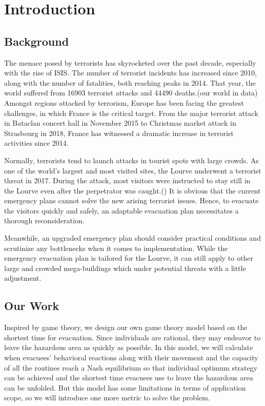 \documentclass{mcmthesis}
\begin{document}
\maketitle                  %

\tableofcontents
\newpage

\section{Introduction}
	\subsection{Background}
	
	The menace posed by terrorists has skyrocketed over the past decade, especially with the rise of ISIS.  The number of terrorist incidents has increased since 2010, along with the number of fatalities, both reaching peaks in 2014. That year, the world suffered from 16903 terrorist attacks and 44490 deaths.(our world in data) Amongst regions attacked by terrorism, Europe has been facing the greatest challenges, in which France is the critical target. From the major terrorist attack in Bataclan concert hall in November 2015 to Christmas market attack in Strasbourg in 2018, France has witnessed a dramatic increase in terrorist activities since 2014.
	
	Normally, terrorists tend to launch attacks in tourist spots with large crowds. As one of the world's largest and most visited sites, the Lourve underwent a terrorist threat in 2017. During the attack, most visitors were instructed to stay still in the Lourve even after the perpetrator was caught.() It is obvious that the current emergency plans cannot solve the new arising terrorist issues. Hence, to evacuate the visitors quickly and safely, an adaptable evacuation plan necessitates a thorough reconsideration. 
	
	Meanwhile, an upgraded emergency plan should consider practical conditions and scrutinize any bottlenecks when it comes to implementation. While the emergency evacuation plan is tailored for the Lourve, it can still apply to other large and crowded mega-buildings which under potential threats with a little adjustment.
	
	
	\subsection{Our Work}
	Inspired by game theory, we design our own game theory model based on the shortest time for evacuation. Since individuals are rational, they may endeavor to leave the hazardous area as quickly as possible. In this model, we will calculate when evacuees’ behavioral reactions along with their movement and the capacity of all the routines reach a Nash equilibrium so that individual optimum strategy can be achieved and the shortest time evacuees use to leave the hazardous area can be unfolded. But this model has some limitations in terms of application scope, so we will introduce one more metric to solve the problem.
	
\end{document}
